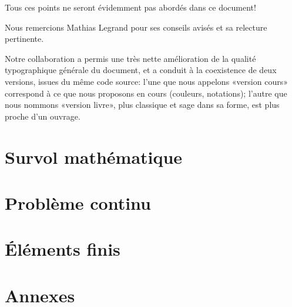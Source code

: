 \documentclass[11pt,pdflatex]{book}
\begin{document}
\medskip
Tous ces points ne seront évidemment pas abordés dans ce document!
\vfill
\noindent
{}

Nous remercions Mathias Legrand pour ses conseils avisés et sa relecture pertinente.

Notre collaboration a permis une très nette amélioration de la qualité typographique générale du document, et a conduit à la coexistence de deux versions, issues du même code source: l'une que nous appelons «version cours» correspond à ce que nous proposons en cours (couleurs, notations); l'autre que nous nommons «version livre», plus classique et sage dans sa forme, est plus proche d'un ouvrage.


\cleardoublepage
\tableofcontents


 \part{Survol mathématique}
 
 
 
 
 
 

 \part{Problème continu}
 
 
 
 

 \part{Éléments finis}
 
 
 
 
 
 
 
 
 
 
 
 

 \appendix
 \part{Annexes}
 
 
 
 
 
\end{document}
